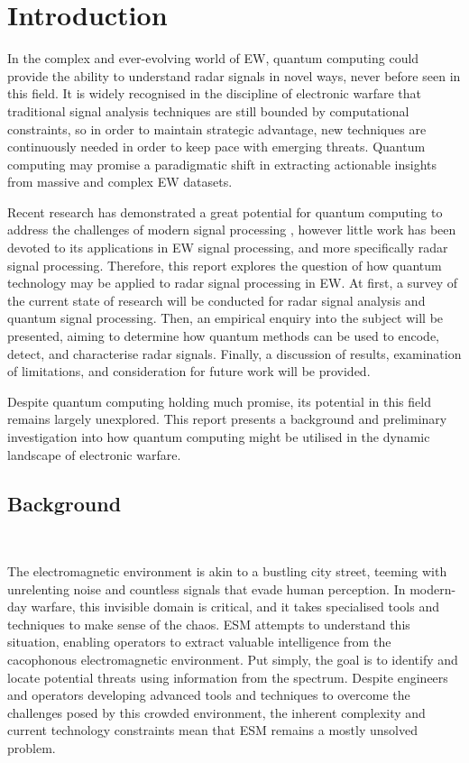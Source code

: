 \section{Introduction}
\label{sec:introduction}

In the complex and ever-evolving world of \ac{EW}, quantum computing could provide the ability to understand radar signals in novel ways, never before seen in this field. 
It is widely recognised in the discipline of electronic warfare that traditional signal analysis techniques are still bounded by computational constraints, so in order to maintain strategic advantage, new techniques are continuously needed in order to keep pace with emerging threats. 
Quantum computing may promise a paradigmatic shift in extracting actionable insights from massive and complex \ac{EW} datasets. 

Recent research has demonstrated a great potential for quantum computing to address the challenges of modern signal processing \cite{somma_quantum_2019, daskin_walk_2022},
however little work has been devoted to its applications in \ac{EW} signal processing, and more specifically radar signal processing.
Therefore, this report explores the question of how quantum technology may be applied to radar signal processing in \ac{EW}.
At first, a survey of the current state of research will be conducted for radar signal analysis and quantum signal processing. 
Then, an empirical enquiry into the subject will be presented, aiming to determine how quantum methods can be used to encode, detect, and characterise radar signals.
Finally, a discussion of results, examination of limitations, and consideration for future work will be provided. 

Despite quantum computing holding much promise, its potential in this field remains largely unexplored.
This report presents a background and preliminary investigation into how quantum computing might be utilised in the dynamic landscape of electronic warfare. 

\subsection{Background}~\label{subsec:background}

The electromagnetic environment is akin to a bustling city street, teeming with unrelenting noise and countless signals that evade human perception.
In modern-day warfare, this invisible domain is critical, and it takes specialised tools and techniques to make sense of the chaos.
\ac{ESM} attempts to understand this situation, enabling operators to extract valuable intelligence from the cacophonous electromagnetic environment.
Put simply, the goal is to identify and locate potential threats using information from the spectrum.
Despite engineers and operators developing advanced tools and techniques to overcome the challenges posed by this crowded environment, the inherent complexity and current technology constraints mean that \ac{ESM} remains a mostly unsolved problem.


